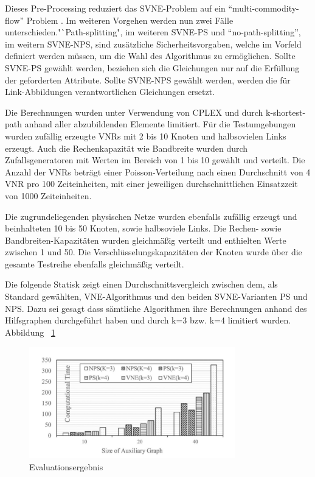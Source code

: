 \documentclass{lni}
\begin{document}
Dieses Pre-Processing reduziert das SVNE-Problem auf ein "`multi-commodity-flow"' Problem \cite{MCF}. 
Im weiteren Vorgehen werden nun zwei Fälle unterschieden."`Path-splitting", im weiteren SVNE-PS und "`no-path-splitting"', im weitern SVNE-NPS, sind zusätzliche Sicherheitsvorgaben, welche im Vorfeld definiert werden müssen, um die Wahl des Algorithmus zu ermöglichen. Sollte SVNE-PS gewählt werden, beziehen sich die Gleichungen nur auf die Erfüllung der geforderten Attribute.
Sollte SVNE-NPS gewählt werden, werden die für Link-Abbildungen verantwortlichen Gleichungen ersetzt.\newline

Die Berechnungen wurden unter Verwendung von CPLEX und durch k-shortest-path anhand aller abzubildenden Elemente limitiert\cite{CPLEX}.
Für die Testumgebungen wurden zufällig erzeugte VNRs mit 2 bis 10 Knoten und halbsovielen Links erzeugt. Auch die Rechenkapazität wie Bandbreite wurden durch Zufallsgeneratoren mit Werten im Bereich von 1 bis 10 gewählt und verteilt. Die Anzahl der VNRs beträgt einer Poisson-Verteilung nach einen Durchschnitt von 4 VNR pro 100 Zeiteinheiten, mit einer jeweiligen durchschnittlichen Einsatzzeit von 1000 Zeiteinheiten.

Die zugrundeliegenden physischen Netze wurden ebenfalls zufällig erzeugt und beinhalteten 10 bis 50 Knoten, sowie halbsoviele Links. Die Rechen- sowie Bandbreiten-Kapazitäten wurden gleichmäßig verteilt und enthielten Werte zwischen 1 und 50. Die Verschlüsselungskapazitäten der Knoten  wurde über die gesamte Testreihe ebenfalls gleichmäßig verteilt.

Die folgende Statisk zeigt einen Durchschnittsvergleich zwischen dem, als Standard gewählten, VNE-Algorithmus und den beiden SVNE-Varianten PS und NPS\cite{Std}. Dazu sei gesagt dass sämtliche Algorithmen ihre Berechnungen anhand des Hilfsgraphen durchgeführt haben und durch k=3 bzw. k=4 limitiert wurden. Abbildung ~\ref{graph10} \newline

\begin{figure}[htb]
\begin{center}
	\includegraphics[width=0.8\textwidth]{statistic.pdf}\newline
	\caption{\label{graph10} Evaluationsergebnis \cite{wang2016towards}}
\end{center}
\end{figure}
\end{document}
